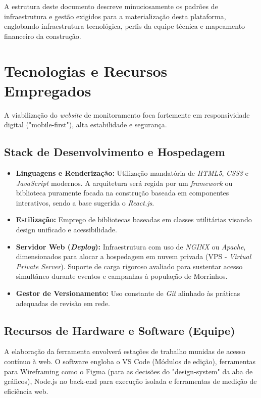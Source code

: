 \documentclass[12pt]{article}
\begin{document}
A estrutura deste documento descreve minuciosamente os padrões de infraestrutura e gestão exigidos para a materialização desta plataforma, englobando infraestrutura tecnológica, perfis da equipe técnica e mapeamento financeiro da construção.

\section{Tecnologias e Recursos Empregados}\label{sec:tecnologias}
A viabilização do \textit{website} de monitoramento foca fortemente em responsividade digital ("mobile-first"), alta estabilidade e segurança.

\subsection{Stack de Desenvolvimento e Hospedagem}
\begin{itemize}[leftmargin=*]
    \item \textbf{Linguagens e Renderização:} Utilização mandatória de \textit{HTML5}, \textit{CSS3} e \textit{JavaScript} modernos. A arquitetura será regida por um \textit{framework} ou biblioteca puramente focada na construção baseada em componentes interativos, sendo a base sugerida o \textit{React.js}.
    \item \textbf{Estilização:} Emprego de bibliotecas baseadas em classes utilitárias visando design unificado e acessibilidade.
    \item \textbf{Servidor Web (\textit{Deploy}):} Infraestrutura com uso de \textit{NGINX} ou \textit{Apache}, dimensionados para alocar a hospedagem em nuvem privada (VPS - \textit{Virtual Private Server}). Suporte de carga rigoroso avaliado para sustentar acesso simultâneo durante eventos e campanhas à população de Morrinhos.
    \item \textbf{Gestor de Versionamento:} Uso constante de \textit{Git} alinhado às práticas adequadas de revisão em rede.
\end{itemize}

\subsection{Recursos de Hardware e Software (Equipe)}
A elaboração da ferramenta envolverá estações de trabalho munidas de acesso contínuo à web. O software engloba o VS Code (Módulos de edição), ferramentas para Wireframing como o Figma (para as decisões do "design-system" da aba de gráficos), Node.js no back-end para execução isolada e ferramentas de medição de eficiência web.
\end{document}
